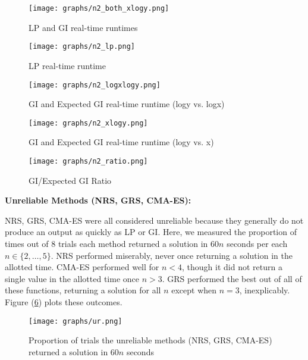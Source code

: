 \documentclass{article}
\begin{document}
\begin{center}
    \begin{figure}[!h]
      \centering
      \texttt{[image: graphs/n2\_both\_xlogy.png]}
      \caption{LP and GI real-time runtimes}
      \label{fig:n2_both}
    \end{figure}

    \begin{figure}[!h]
      \centering
      \texttt{[image: graphs/n2\_lp.png]}
      \caption{LP real-time runtime}
      \label{fig:n2_lp}
    \end{figure}

    \begin{figure}[!h]
      \centering
      \texttt{[image: graphs/n2\_logxlogy.png]}
      \caption{GI and Expected GI real-time runtime (logy vs. logx)}
      \label{fig:n2_gi,expgi_lxly}
    \end{figure}

    \begin{figure}[!h]
      \centering
      \texttt{[image: graphs/n2\_xlogy.png]}
      \caption{GI and Expected GI real-time runtime (logy vs. x)}
      \label{fig:n2_gi,expgi_ly}
    \end{figure}

    \begin{figure}[!h]
      \centering
      \texttt{[image: graphs/n2\_ratio.png]}
      \caption{GI/Expected GI Ratio}
      \label{fig:n2_ratio}
    \end{figure}
\end{center}

\textbf{Unreliable Methods (NRS, GRS, CMA-ES):}

NRS, GRS, CMA-ES were all considered unreliable because they generally do not produce an output as quickly as LP or GI. Here, we measured the proportion of times out of 8 trials each method returned a solution in $60n$ seconds per each $n \in \{2, \dots, 5\}$. NRS performed miserably, never once returning a solution in the allotted time. CMA-ES performed well for $n<4$, though it did not return a single value in the allotted time once $n>3$. GRS performed the best out of all of these functions, returning a solution for all $n$ except when $n=3$, inexplicably. Figure (\ref{fig:ur}) plots these outcomes.

\begin{center}
    \begin{figure}[!h]
      \centering
      \texttt{[image: graphs/ur.png]}
      \caption{Proportion of trials the unreliable methods (NRS, GRS, CMA-ES) returned a solution in $60n$ seconds}
      \label{fig:ur}
    \end{figure}
\end{center}
\end{document}
